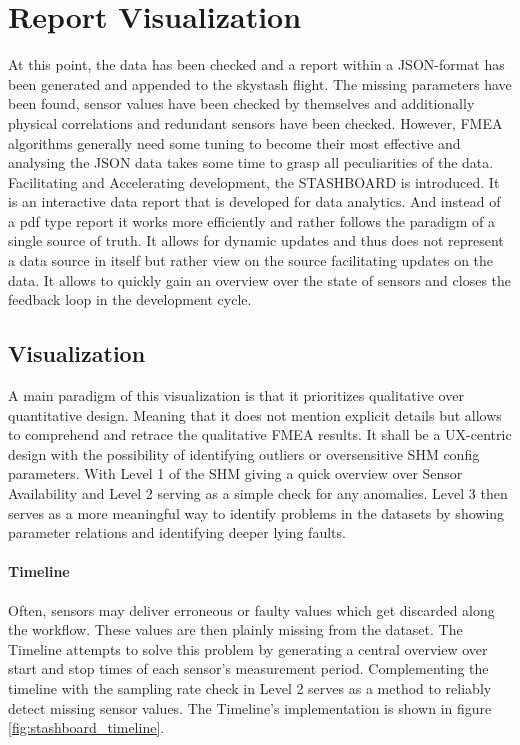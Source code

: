 \newpage


\section{Report Visualization}

At this point, the data has been checked and a report within a JSON-format has been generated and appended to the skystash flight. The missing parameters have been found, sensor values have been checked by themselves and additionally physical correlations and redundant sensors have been checked. However, FMEA algorithms generally need some tuning to become their most effective and analysing the JSON data takes some time to grasp all peculiarities of the data. Facilitating and Accelerating development, the STASHBOARD is introduced. It is an interactive data report that is developed for data analytics. And instead of a pdf type report it works more efficiently and rather follows the paradigm of a single source of truth. It allows for dynamic updates and thus does not represent a data source in itself but rather view on the source facilitating updates on the data. It allows to quickly gain an overview over the state of sensors and closes the feedback loop in the development cycle.

\subsection{Visualization}
\label{chap:4-visualization}
A main paradigm of this visualization is that it prioritizes qualitative over quantitative design. Meaning that it does not mention explicit details but allows to comprehend and retrace the qualitative FMEA results. It shall be a UX-centric design with the possibility of identifying outliers or oversensitive SHM config parameters. With Level 1 of the SHM giving a quick overview over Sensor Availability and Level 2 serving as a simple check for any anomalies. Level 3 then serves as a more meaningful way to identify problems in the datasets by showing parameter relations and identifying deeper lying faults.

\paragraph{Timeline}

Often, sensors may deliver erroneous or faulty values which get discarded along the workflow. These values are then plainly missing from the dataset. The Timeline attempts to solve this problem by generating a central overview over start and stop times of each sensor's measurement period. Complementing the timeline with the sampling rate check in Level 2 serves as a method to reliably detect missing sensor values. The Timeline's implementation is shown in figure \ref{fig:stashboard_timeline}.

